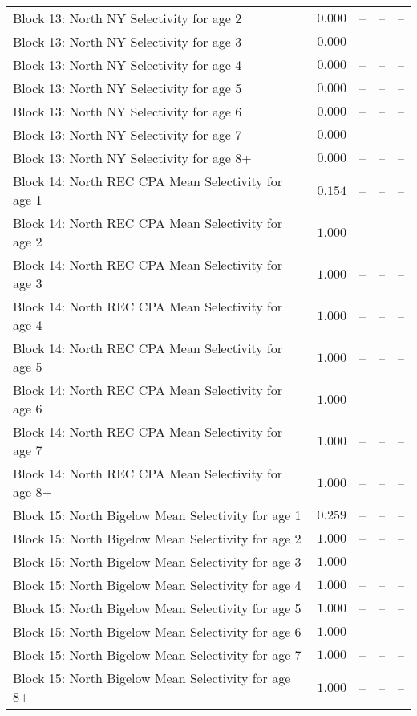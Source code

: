 \documentclass[
]{article}
\begin{document}
\begin{landscape}
\begin{longtable}[t]{lrrrr}
Block 13: North NY Selectivity for age 2 & $0.000$ & -- & -- & --\\
\addlinespace
Block 13: North NY Selectivity for age 3 & $0.000$ & -- & -- & --\\
Block 13: North NY Selectivity for age 4 & $0.000$ & -- & -- & --\\
Block 13: North NY Selectivity for age 5 & $0.000$ & -- & -- & --\\
Block 13: North NY Selectivity for age 6 & $0.000$ & -- & -- & --\\
Block 13: North NY Selectivity for age 7 & $0.000$ & -- & -- & --\\
\addlinespace
Block 13: North NY Selectivity for age 8+ & $0.000$ & -- & -- & --\\
Block 14: North REC CPA Mean Selectivity for age 1 & $0.154$ & -- & -- & --\\
Block 14: North REC CPA Mean Selectivity for age 2 & $1.000$ & -- & -- & --\\
Block 14: North REC CPA Mean Selectivity for age 3 & $1.000$ & -- & -- & --\\
Block 14: North REC CPA Mean Selectivity for age 4 & $1.000$ & -- & -- & --\\
\addlinespace
Block 14: North REC CPA Mean Selectivity for age 5 & $1.000$ & -- & -- & --\\
Block 14: North REC CPA Mean Selectivity for age 6 & $1.000$ & -- & -- & --\\
Block 14: North REC CPA Mean Selectivity for age 7 & $1.000$ & -- & -- & --\\
Block 14: North REC CPA Mean Selectivity for age 8+ & $1.000$ & -- & -- & --\\
Block 15: North Bigelow Mean Selectivity for age 1 & $0.259$ & -- & -- & --\\
\addlinespace
Block 15: North Bigelow Mean Selectivity for age 2 & $1.000$ & -- & -- & --\\
Block 15: North Bigelow Mean Selectivity for age 3 & $1.000$ & -- & -- & --\\
Block 15: North Bigelow Mean Selectivity for age 4 & $1.000$ & -- & -- & --\\
Block 15: North Bigelow Mean Selectivity for age 5 & $1.000$ & -- & -- & --\\
Block 15: North Bigelow Mean Selectivity for age 6 & $1.000$ & -- & -- & --\\
\addlinespace
Block 15: North Bigelow Mean Selectivity for age 7 & $1.000$ & -- & -- & --\\
Block 15: North Bigelow Mean Selectivity for age 8+ & $1.000$ & -- & -- & --\\

\end{longtable}
\end{landscape}
\end{document}
